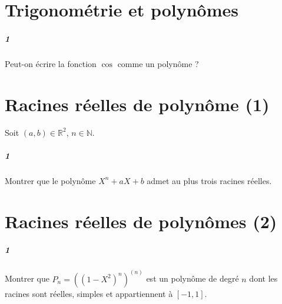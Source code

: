 \documentclass[10pt,a4paper]{article}
\begin{document}
\section{Trigonométrie et polynômes}
\subparagraph{1}Peut-on écrire la fonction $\cos$ comme un polynôme ?
\section{Racines réelles de polynôme (1)}
Soit $(a,b) \in \mathbb{R}^2$, $n \in \mathbb{N}$.
\subparagraph{1}Montrer que le polynôme $X^n+aX+b$ admet au plus trois racines réelles.

\section{Racines réelles de polynômes (2)}
\subparagraph{1}Montrer que $P_n=((1-X^2)^n)^{(n)}$ est un polynôme de degré $n$ dont les racines sont réelles, simples et appartiennent à $[-1,1]$.
\end{document}
